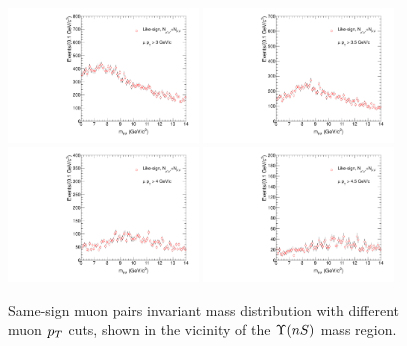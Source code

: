 \begin{figure}[h!]
 \begin{center}
    \includegraphics[angle=0,width=0.45\textwidth]{chap_YInPbPbColl2011_figures/dimuon_likesign_pt3}
    \includegraphics[angle=0,width=0.45\textwidth]{chap_YInPbPbColl2011_figures/dimuon_likesign_pt35}\\
    \includegraphics[angle=0,width=0.45\textwidth]{chap_YInPbPbColl2011_figures/dimuon_likesign_pt4}
    \includegraphics[angle=0,width=0.45\textwidth]{chap_YInPbPbColl2011_figures/dimuon_likesign_pt45}
    \caption{Same-sign muon pairs invariant mass distribution with different muon $p_T$ cuts, shown in the vicinity of the $\Upsilon(nS)$ mass region.}
    \label{fig:mu_pt_bkg_shape}
 \end{center}
\end{figure}

